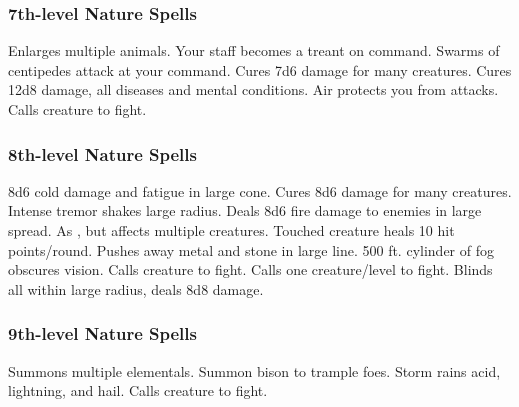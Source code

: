 \subsubsection{7th-level Nature Spells}
\begin{spelllist}
     Enlarges multiple animals.
     Your staff becomes a treant on command.
     Swarms of centipedes attack at your command.
     Cures 7d6 damage for many creatures.
     Cures 12d8 damage, all diseases and mental conditions.
     Air protects you from attacks. 
     Calls creature to fight.
\end{spelllist}

\subsubsection{8th-level Nature Spells}
\begin{spelllist}
     8d6 cold damage and fatigue in large cone.
     Cures 8d6 damage for many creatures.
     Intense tremor shakes large radius.
     Deals 8d6 fire damage to enemies in large spread.
     As , but affects multiple creatures.
     Touched creature heals 10 hit points/round.
     Pushes away metal and stone in large line.
     500 ft. cylinder of fog obscures vision.
     Calls creature to fight.
     Calls one creature/level to fight.
     Blinds all within large radius, deals 8d8 damage.
\end{spelllist}

\subsubsection{9th-level Nature Spells}
\begin{spelllist}
     Summons multiple elementals.
     Summon bison to trample foes.
     Storm rains acid, lightning, and hail.
     Calls creature to fight.
\end{spelllist}

